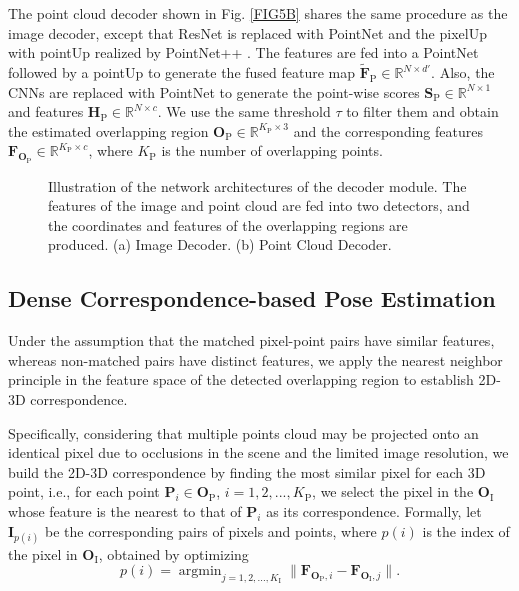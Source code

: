 \documentclass[lettersize,journal]{IEEEtran}
\begin{document}
The point cloud decoder shown in Fig. \ref{FIG5B} shares the same procedure as the image decoder, except that ResNet is replaced with PointNet and the pixelUp with pointUp realized by PointNet++ \cite{POINTNET2}. 
The features are fed into a PointNet followed by a pointUp to generate the fused feature map $\widetilde{\mathbf{F}}_{\text{P}} \in \mathbb{R}^{N\times d '}$. Also, the CNNs are replaced with PointNet to generate the point-wise scores $\mathbf{S}_{\text{P}} \in \mathbb{R}^{N\times 1}$ and features $\mathbf{H}_{\text{P}} \in \mathbb{R}^{N\times c}$. We use the same threshold $\tau$ to filter them and obtain the estimated overlapping region $\mathbf{O}_{\text{P}}\in \mathbb{R}^{K_{\text{P}}\times 3}$ and the corresponding features $\mathbf{F}_{\mathbf{O}_{\text{P}}}\in \mathbb{R}^{K_{\text{P}}\times c}$, where $K_{\text{P}}$ is the number of overlapping points.



\begin{figure*}[!htbp]
\centering
{}

\caption{Illustration of the network architectures of the decoder module. The features of the image and point cloud are fed into two detectors, and the coordinates and features of the overlapping regions are produced. (a) Image Decoder. (b) Point Cloud Decoder.}
\label{FIG5}
\end{figure*}

\subsection{Dense Correspondence-based Pose Estimation}
Under the assumption that the matched pixel-point pairs have similar features, whereas non-matched pairs have distinct features, we apply the nearest neighbor principle in the feature space of the detected overlapping region to establish 2D-3D correspondence.

Specifically, considering that multiple points cloud may be projected onto an identical pixel due to occlusions in the scene and the limited image resolution, we build the 2D-3D correspondence by finding the most similar pixel for each 3D point, i.e., 
for each point $\mathbf{P}_{i} \in \mathbf{O}_{\text{P}}$, $i=1,2,...,K_{\text{P}}$, we select the pixel in the $\mathbf{O}_{\text{I}}$ whose feature is the nearest to that of $\mathbf{P}_{i}$  as its correspondence. 
Formally, let $\mathbf{I}_{p(i)}$ be the corresponding pairs of pixels and points, where $p(i)$ is the index of the pixel in $\mathbf{O}_{\text{I}}$, obtained by optimizing 
\begin{equation}
p(i)=\mathop{\arg\min}_{j=1,2,...,K_{\text{I}}} \|\mathbf{F}_{\mathbf{O}_{\text{P}} ,i} -\mathbf{F}_{\mathbf{O}_{\text{I}} ,j} \|.
\end{equation}
\end{document}
